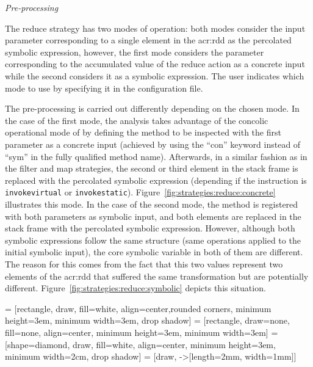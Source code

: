 \textit{Pre-processing}

The reduce strategy has two modes of operation: both modes consider the input parameter corresponding to a single element in the \acrshort{acr:rdd} as the percolated symbolic expression, however, the first mode considers the parameter corresponding to the accumulated value of the reduce action as a concrete input while the second considers it as a symbolic expression. The user indicates which mode to use by specifying it in the configuration file.

The pre-processing is carried out differently depending on the chosen mode. In the case of the first mode, the analysis takes advantage of the concolic operational mode of \spf by defining the method to be inspected with the first parameter as a concrete input (achieved by using the ``con'' keyword instead of ``sym'' in the fully qualified method name). Afterwards, in a similar fashion as in the filter and map strategies, the second or third element in the stack frame is replaced with the percolated symbolic expression (depending if the instruction is \texttt{invokevirtual} or \texttt{invokestatic}). Figure~\ref{fig:strategies:reduce:concrete} illustrates this mode. In the case of the second mode, the method is registered with both parameters as symbolic input, and both elements are replaced in the stack frame with the percolated symbolic expression. However, although both symbolic expressions follow the same structure (same operations applied to the initial symbolic input), the core symbolic variable in both of them are different. The reason for this comes from the fact that this two values represent two elements of the \acrshort{acr:rdd} that suffered the same transformation but are potentially different. Figure~\ref{fig:strategies:reduce:symbolic} depicts this situation.

 = [rectangle, draw, fill=white, align=center,rounded corners, minimum height=3em, minimum width=3em, drop shadow]
 = [rectangle, draw=none, fill=none, align=center, minimum height=3em, minimum width=3em]
 = [shape=diamond, draw, fill=white, align=center, minimum height=3em, minimum width=2cm, drop shadow]
 = [draw, -{>[length=2mm, width=1mm]}]

